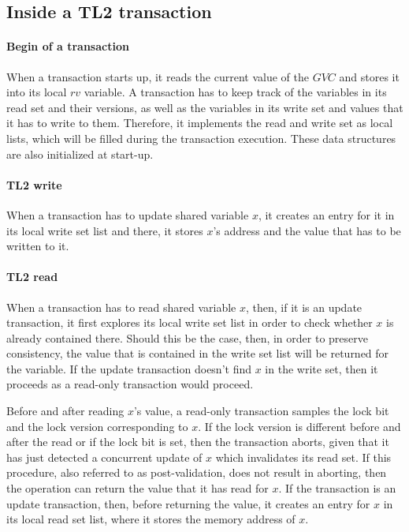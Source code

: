 \documentclass[11pt,letterpaper]{article}
\begin{document}
\subsection{Inside a TL2 transaction}

\paragraph{Begin of a transaction}
When a  transaction starts  up, it  reads the current  value of  the $\mathit{GVC}$ 
and stores it into  
its local  $\mathit{rv}$ variable. A transaction  has to keep  track of the
variables in its read set and their  
versions, as well as the variables in  its write set and values that it has
to write to them. Therefore, it  
implements the  read and  write set  as local lists,  which will  be filled
during the transaction execution.  
These data structures are also initialized at start-up.

\paragraph{TL2 write}
When a transaction  has to update shared variable $x$,  it creates an entry
for it in its local write set list  
and there, it  stores $x${}'s address and the value that  has to be written
to it.  

\paragraph{TL2 read}
When  a transaction has  to read  shared variable  $x$, then,  if it  is an
update transaction, it first explores  
its local write set list in order to check whether $x$ is already contained
there. Should this be the case,  
then, in order to preserve consistency,  the value that is contained in the
write set list will be returned for  
the variable.  If the  update transaction doesn{}'t  find $x$ in  the write
set, then it proceeds as a read-only   transaction would proceed. 

Before and after reading $x${}'s value, a read-only transaction samples the
lock bit and the lock version  
corresponding to $x$. If the lock version is different before and after the
read or if the lock bit is set, then  
the transaction aborts, given that it has just detected a concurrent update
of $x$ which invalidates its read  
set.  If this  procedure, also  referred  to as  post-validation, does  not
result in aborting, then the operation can   
return the value that it has read  for $x$. If the transaction is an update
transaction, then, before returning the  
value, it  creates an entry for  $x$ in its  local read set list,  where it
stores the memory address of $x$.  
\end{document}
